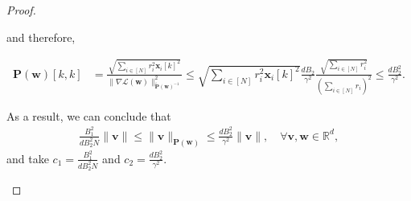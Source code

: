 \documentclass{article} %
\theoremstyle{plain}
\theoremstyle{definition}
\theoremstyle{remark}
\newcommand{\Ls}{\mathcal{L}}
\def\bx{{\mathbf x}}
\def\bP{{\mathbf P}}
\def\bw{{\mathbf w}}
\def\bv{{\mathbf v}}
\begin{document}
\begin{proof}
\begin{enumerate}[label=(\alph*)]
and therefore, 

\begin{align*}
\bP(\bw)[k, k] &= \frac{\sqrt{\sum_{i \in [N]} r_i^2 \bx_i[k]^2}}{\|\nabla \Ls(\bw)\|_{\tilde{\bP}(\bw)^{-1}}^2} \leq \sqrt{\sum_{i \in [N]} r_i^2 \bx_i[k]^2} \frac{d B_2}{\gamma^2} \frac{\sqrt{\sum_{i \in [N]} r_i^2}}{(\sum_{i \in [N]} r_i)^2} \leq \frac{d B_2^2}{\gamma^2}.
\end{align*}

As a result, we can conclude that
\begin{align*}
    \frac{B_1^2}{dB_2^2N} \|\bv\| \leq \|\bv\|_{\bP(\bw)} \leq \frac{d B_2^2}{\gamma^2} \|\bv\|, \quad \forall \bv, \bw \in \mathbb{R}^d,
\end{align*}
and take $c_1 = \frac{B_1^2}{dB_2^2N}$ and $c_2 = \frac{d B_2^2}{\gamma^2}$.
\end{enumerate}
\end{proof}
\end{document}
